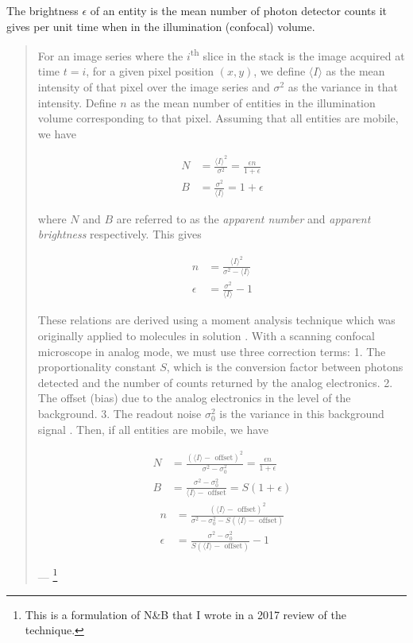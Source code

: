 \documentclass[12pt,]{book}
\let\rmarkdownfootnote\footnote%
\def\footnote{\protect\rmarkdownfootnote}
\theoremstyle{definition}
\theoremstyle{definition}
\theoremstyle{definition}
\theoremstyle{remark}
\let\BeginKnitrBlock\begin \let\EndKnitrBlock\end
\begin{document}
\BeginKnitrBlock{definition}
\protect\hypertarget{def:unnamed-chunk-14}{}{\label{def:unnamed-chunk-14}
}The brightness \(\epsilon\) of an entity is the mean number of photon
detector counts it gives per unit time when in the illumination
(confocal) volume.
\EndKnitrBlock{definition}

\begin{quote}
For an image series where the \(i\)\textsuperscript{th} slice in the
stack is the image acquired at time \(t = i\), for a given pixel
position \((x, y)\), we define \(\langle I \rangle\) as the mean
intensity of that pixel over the image series and \(\sigma^2\) as the
variance in that intensity. Define \(n\) as the mean number of entities
in the illumination volume corresponding to that pixel. Assuming that
all entities are mobile, we have

\begin{align}
N &= \frac{\langle I \rangle^2}{\sigma^2} = \frac{\epsilon n}{1 + \epsilon} \label{eq:NB1-1} \\
B &= \frac{\sigma^2}{\langle I \rangle} = 1 + \epsilon \label{eq:NB1-2}
\end{align}

where \(N\) and \(B\) are referred to as the \emph{apparent number} and
\emph{apparent brightness} respectively. This gives

\begin{align}
n &= \frac{\langle I \rangle^2}{\sigma^2 - \langle I \rangle} \label{eq:NB2-2} \\
\epsilon &= \frac{\sigma^2}{\langle I \rangle} - 1 \label{eq:NB2-1}
\end{align}

These relations are derived using a moment analysis technique which was
originally applied to molecules in solution \citep{QianElson}. With a
scanning confocal microscope in analog mode, we must use three
correction terms: 1. The proportionality constant \(S\), which is the
conversion factor between photons detected and the number of counts
returned by the analog electronics. 2. The offset (bias) due to the
analog electronics in the level of the background. 3. The readout noise
\(\sigma_0^2\) is the variance in this background signal \citep{Dalal}.
Then, if all entities are mobile, we have

\begin{align}
N &= \frac{(\langle I \rangle - \text{ offset})^2}{\sigma^2 - \sigma_0^2} = \frac{\epsilon n}{1 + \epsilon} \label{eq:NBa1-1} \\
B &= \frac{\sigma^2 - \sigma_0^2}{\langle I \rangle - \text{ offset}} = S(1 + \epsilon) \label{eq:NBa1-2}
\end{align}\begin{align}
n &= \frac{(\langle I \rangle - \text{ offset})^2}{\sigma^2 - \sigma_0^2 - S(\langle I \rangle - \text{ offset})} \label{eq:NBa2-2} \\
\epsilon &= \frac{\sigma^2 - \sigma_0^2}{S(\langle I \rangle - \text{ offset})} - 1 \label{eq:NBa2-1}
\end{align}

--- \citet{NBreview}\footnote{This is a formulation of N\&B that I wrote
  in a 2017 review of the technique.}
\end{quote}
\end{document}
